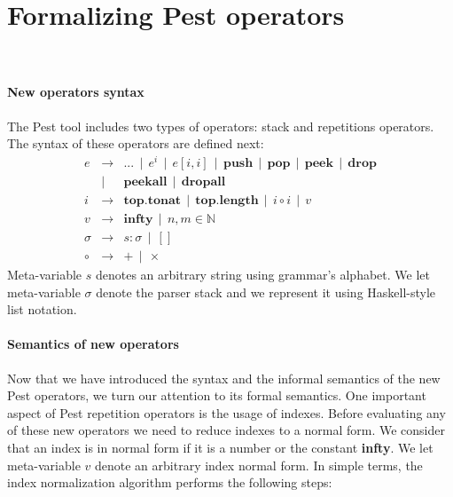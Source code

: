 \documentclass[sigplan,screen]{acmart}
\theoremstyle{definition}
\begin{document}
\section{Formalizing Pest operators}~\label{sec:pest-formalization}


\paragraph{New operators syntax}
The Pest tool includes two types of operators: stack and repetitions operators.
The syntax of these operators are defined next:
\[
\begin{array}{lcl}
  e & \to  & ...\,\mid\,e^i\,\mid\,e[i,i]\,\mid\,\mathbf{push}\,\mid\,\mathbf{pop}\,\mid\,\mathbf{peek}
             \,\mid\,\mathbf{drop}\\
    & \mid & \mathbf{peekall}\,\mid\,\mathbf{dropall}\\
  i & \to  & \mathbf{top.tonat}\,\mid\,\mathbf{top.length}\,\mid\,i \circ i\,\mid\,v\\
  v & \to  & \mathbf{infty}\,\mid\,n,m\in\mathbb{N}\\
  \sigma & \to & s : \sigma\,\mid\,[] \\
  \circ & \to & + \,\mid\, \times
\end{array}
\]
Meta-variable $s$ denotes an arbitrary string using grammar's alphabet.
We let meta-variable $\sigma$ denote the parser stack and we represent it
using Haskell-style list notation.

\paragraph{Semantics of new operators}
Now that we have introduced the syntax and the informal semantics of the new Pest
operators, we turn our attention to its formal semantics. One important aspect
of Pest repetition operators is the usage of indexes. Before evaluating any
of these new operators we need to reduce indexes to a normal form.
We consider that an index is in normal form if it is a number or the constant
\textbf{infty}. We let meta-variable $v$ denote an arbitrary index normal form.
In simple terms, the index normalization algorithm performs the following steps:
\end{document}
